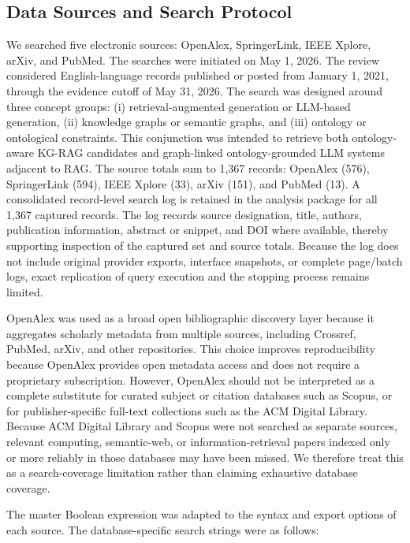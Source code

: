 \subsection{Data Sources and Search Protocol}
\label{sec:search-protocol}
We searched five electronic sources: OpenAlex\cite{b14}, SpringerLink\cite{b15}, IEEE Xplore\cite{b18}, arXiv\cite{b16}, and PubMed\cite{b17}. The searches were initiated on May 1, 2026. The review considered English-language records published or posted from January 1, 2021, through the evidence cutoff of May 31, 2026. The search was designed around three concept groups: (i) retrieval-augmented generation or LLM-based generation, (ii) knowledge graphs or semantic graphs, and (iii) ontology or ontological constraints. This conjunction was intended to retrieve both ontology-aware KG-RAG candidates and graph-linked ontology-grounded LLM systems adjacent to RAG. The source totals sum to 1,367 records: OpenAlex (576), SpringerLink (594), IEEE Xplore (33), arXiv (151), and PubMed (13). A consolidated record-level search log is retained in the analysis package for all 1,367 captured records. The log records source designation, title, authors, publication information, abstract or snippet, and DOI where available, thereby supporting inspection of the captured set and source totals. Because the log does not include original provider exports, interface snapshots, or complete page/batch logs, exact replication of query execution and the stopping process remains limited.

OpenAlex was used as a broad open bibliographic discovery layer because it aggregates scholarly metadata from multiple sources, including Crossref, PubMed, arXiv, and other repositories. This choice improves reproducibility because OpenAlex provides open metadata access and does not require a proprietary subscription. However, OpenAlex should not be interpreted as a complete substitute for curated subject or citation databases such as Scopus, or for publisher-specific full-text collections such as the ACM Digital Library. Because ACM Digital Library and Scopus were not searched as separate sources, relevant computing, semantic-web, or information-retrieval papers indexed only or more reliably in those databases may have been missed. We therefore treat this as a search-coverage limitation rather than claiming exhaustive database coverage.

The master Boolean expression was adapted to the syntax and export options of each source. The database-specific search strings were as follows:

